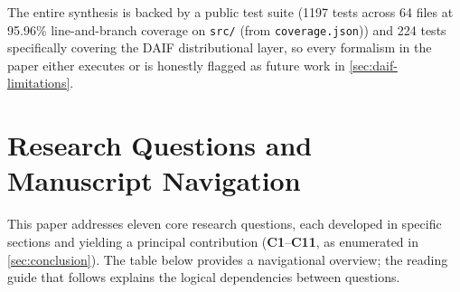 \documentclass[
]{article}
\begin{document}
The entire synthesis is backed by a public test suite (1197 tests across
64 files at 95.96\% line-and-branch coverage on \texttt{src/} (from
\texttt{coverage.json})) and 224 tests specifically covering the DAIF
distributional layer, so every formalism in the paper either executes or
is honestly flagged as future work in \autoref{sec:daif-limitations}.

\newpage

\section{Research Questions and Manuscript
Navigation}\label{sec:research-questions}

This paper addresses eleven core research questions, each developed in
specific sections and yielding a principal contribution
(\textbf{C1}--\textbf{C11}, as enumerated in \autoref{sec:conclusion}).
The table below provides a navigational overview; the reading guide that
follows explains the logical dependencies between questions.

\begingroup
\small
\end{document}
